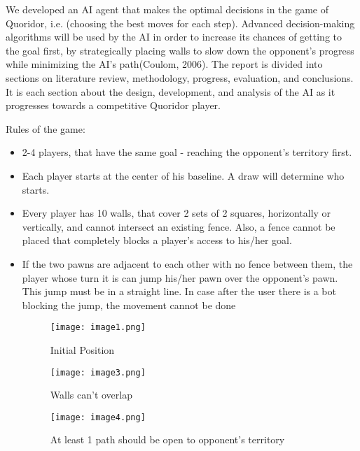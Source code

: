 \documentclass[12pt]{report}
\begin{document}
We developed an AI agent that makes the optimal decisions in the game of Quoridor, i.e. (choosing the best moves for each step). Advanced decision-making algorithms will be used by the AI in order to increase its chances of getting to the goal first, by strategically placing walls to slow down the opponent’s progress while minimizing the AI’s path(Coulom, 2006). The report is divided into sections on literature review, methodology, progress, evaluation, and conclusions. It is each section about the design, development, and analysis of the AI as it progresses towards a competitive Quoridor player.



Rules of the game:
\begin{itemize}
    \item 2-4 players, that have the same goal - reaching the opponent’s territory first. 
    \item Each player starts at the center of his baseline. A draw will determine who starts.
    \item Every player has 10 walls, that cover 2 sets of 2 squares, horizontally or vertically, and cannot intersect an existing fence. Also, a fence cannot be placed that completely blocks a player’s access to his/her goal. 
    \item If the two pawns are adjacent to each other with no fence between them, the player whose turn it is can jump his/her pawn over the opponent’s pawn. This jump must
be in a straight line. In case after the user there is a bot blocking the jump, the movement cannot be done

\begin{figure}[h!]
  \centering
  \begin{minipage}{0.3\textwidth}
    \centering
    \texttt{[image: image1.png]}
    \caption{Initial Position}
    \label{fig:Initial position}
  \end{minipage}
  \hspace{0.5cm}  
  \begin{minipage}{0.3\textwidth}
    \centering
    \texttt{[image: image3.png]}
    \caption{Walls can't overlap}
    \label{fig:image2}
  \end{minipage}
  \hspace{0.5cm}  
  \begin{minipage}{0.3\textwidth}
    \centering
    \texttt{[image: image4.png]}
    \caption{At least 1 path should be open to opponent's territory}
    \label{fig:image3}
  \end{minipage}
\end{figure}
    
\end{itemize}
 
\end{document}
